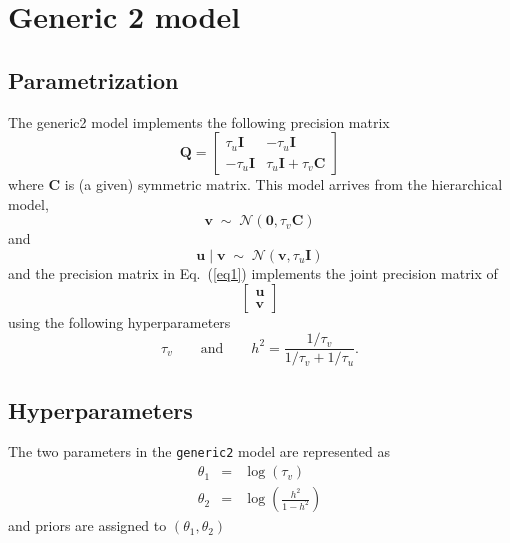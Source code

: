 \documentclass[a4paper,11pt]{article}
\def\mm#1{\ensuremath{\boldsymbol{#1}}} %
\begin{document}
\section*{Generic 2 model}

\subsection*{Parametrization}

The generic2 model implements the following precision matrix
\begin{equation}\label{eq1}%
    \mathbf{Q}=
    \begin{bmatrix}
        \tau_{u} \mm{I} & -\tau_{u}\mm{I} \\
        -\tau_{u}\mm{I} & \tau_{u}\mm{I} + \tau_{v} \mm{C}
    \end{bmatrix}
\end{equation}
where $\mathbf{C}$ is (a given) symmetric matrix. This model arrives from the
hierarchical model,
\begin{displaymath}
    \mm{v} \;\sim\; {\mathcal N}(\mm{0}, \tau_v \mm{C})
\end{displaymath}
and
\begin{displaymath}
    \mm{u}\mid \mm{v} \;\sim\; {\mathcal N}(\mm{v}, \tau_{u} \mm{I})
\end{displaymath}
and the precision matrix in Eq.~(\ref{eq1}) implements the joint
precision matrix of
\begin{displaymath}
    \begin{bmatrix}
        \mm{u}\\
        \mm{v}
    \end{bmatrix}
\end{displaymath}
using the following hyperparameters
\begin{displaymath}
    \tau_{v}\qquad\text{and}\qquad   h^{2} = \frac{1/\tau_{v}}{1/\tau_{v} + 1/\tau_{u}}.
\end{displaymath}


\subsection*{Hyperparameters}

The two parameters in the \texttt{generic2} model are represented as
\begin{eqnarray*}
    \theta_1 &= & \log(\tau_{v})\\
    \theta_2 &=& \log\left(
      \frac{h^{2}}{1-h^{2}}\right)
\end{eqnarray*}
and priors are assigned to $(\theta_1,\theta_2)$
\end{document}
